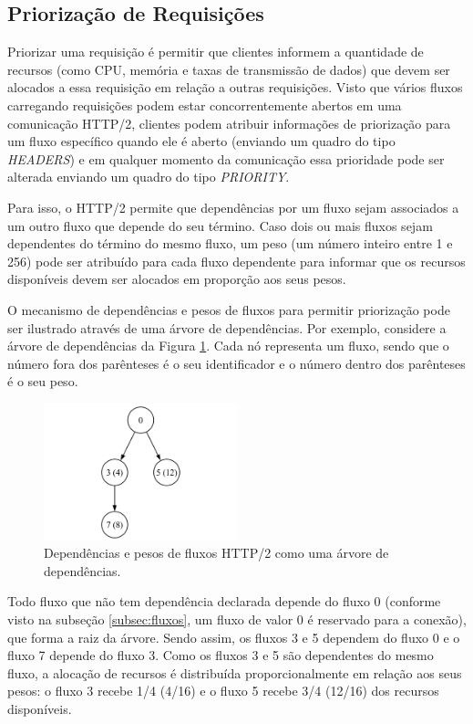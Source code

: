 \subsection{Priorização de Requisições}
\label{subsec:priority}

Priorizar uma requisição é permitir que clientes informem a quantidade de recursos (como CPU, memória e taxas de transmissão de dados) que devem ser alocados a essa requisição em relação a outras requisições. Visto que vários fluxos carregando requisições podem estar concorrentemente abertos em uma comunicação HTTP/2, clientes podem atribuir informações de priorização para um fluxo específico quando ele é aberto (enviando um quadro do tipo {\em HEADERS}) e em qualquer momento da comunicação essa prioridade pode ser alterada enviando um quadro do tipo {\em PRIORITY}.

Para isso, o HTTP/2 permite que dependências por um fluxo sejam associados a um outro fluxo que depende do seu término. Caso dois ou mais fluxos sejam dependentes do término do mesmo fluxo, um peso (um número inteiro entre 1 e 256) pode ser atribuído para cada fluxo dependente para informar que os recursos disponíveis devem ser alocados em proporção aos seus pesos.

O mecanismo de dependências e pesos de fluxos para permitir priorização pode ser ilustrado através de uma árvore de dependências. Por exemplo, considere a árvore de dependências da Figura \ref{fig:dependency_tree}. Cada nó representa um fluxo, sendo que o número fora dos parênteses é o seu identificador e o número dentro dos parênteses é o seu peso.

\begin{figure}[hbt!]
 \centering
  \includegraphics[width=0.5\textwidth]{./fig/dependency_tree}
 \caption{Dependências e pesos de fluxos HTTP/2 como uma árvore de dependências.}
 \label{fig:dependency_tree}
\end{figure}

Todo fluxo que não tem dependência declarada depende do fluxo 0 (conforme visto na subseção \ref{subsec:fluxos}, um fluxo de valor 0 é reservado para a conexão), que forma a raiz da árvore. Sendo assim, os fluxos 3 e 5 dependem do fluxo 0 e o fluxo 7 depende do fluxo 3. Como os fluxos 3 e 5 são dependentes do mesmo fluxo, a alocação de recursos é distribuída proporcionalmente em relação aos seus pesos: o fluxo 3 recebe 1/4 (4/16) e o fluxo 5 recebe 3/4 (12/16) dos recursos disponíveis.

